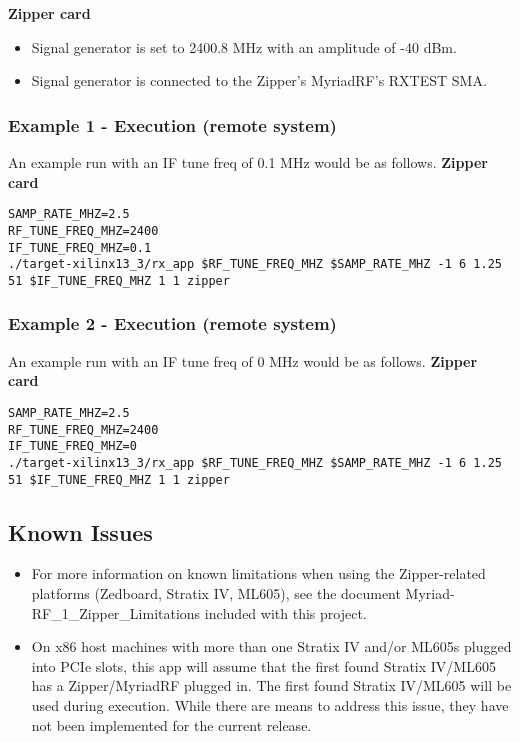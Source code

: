 \noindent\textbf{Zipper card}
\begin{itemize}
  \item Signal generator is set to 2400.8 MHz with an amplitude of -40 dBm.
  \item Signal generator is connected to the Zipper's MyriadRF's RXTEST SMA.
\end{itemize}

\subsubsection{Example 1 - Execution (remote system)}
An example run with an IF tune freq of 0.1 MHz would be as follows.
\noindent\textbf{Zipper card}
\begin{lstlisting}
SAMP_RATE_MHZ=2.5
RF_TUNE_FREQ_MHZ=2400
IF_TUNE_FREQ_MHZ=0.1
./target-xilinx13_3/rx_app $RF_TUNE_FREQ_MHZ $SAMP_RATE_MHZ -1 6 1.25 51 $IF_TUNE_FREQ_MHZ 1 1 zipper
\end{lstlisting}

\subsubsection{Example 2 - Execution (remote system)}
An example run with an IF tune freq of 0 MHz would be as follows.
\noindent\textbf{Zipper card}
\begin{lstlisting}
SAMP_RATE_MHZ=2.5
RF_TUNE_FREQ_MHZ=2400
IF_TUNE_FREQ_MHZ=0
./target-xilinx13_3/rx_app $RF_TUNE_FREQ_MHZ $SAMP_RATE_MHZ -1 6 1.25 51 $IF_TUNE_FREQ_MHZ 1 1 zipper
\end{lstlisting}

\subsection{Known Issues}
\noindent
\begin{itemize}
  \item For more information on known limitations when using the Zipper-related platforms (Zedboard, Stratix IV, ML605), see the document Myriad-RF\_1\_Zipper\_Limitations included with this project.
  \item  On x86 host machines with more than one Stratix IV and/or ML605s plugged into PCIe slots, this app will assume that the first found Stratix IV/ML605 has a Zipper/MyriadRF plugged in. The first found Stratix IV/ML605 will be used during execution. While there are means to address this issue, they have not been implemented for the current release.
\end{itemize}



